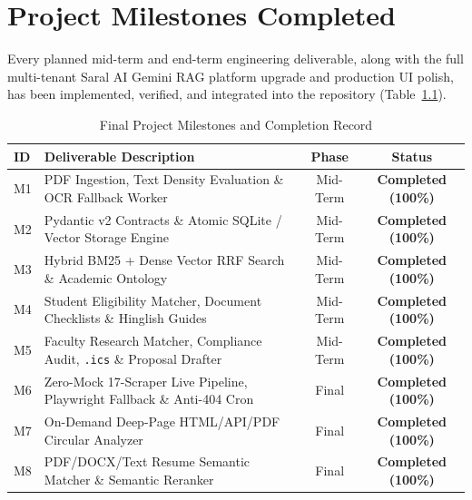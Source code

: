\documentclass[12pt,a4paper,oneside]{report}
\begin{document}
\chapter{Project Milestones Completed}

Every planned mid-term and end-term engineering deliverable, along with the full multi-tenant Saral AI Gemini RAG platform upgrade and production UI polish, has been implemented, verified, and integrated into the repository (Table~\ref{tab:milestones}).

\begin{table}[htbp]
    \centering
    \caption{Final Project Milestones and Completion Record}
    \label{tab:milestones}
    \footnotesize
    \begin{tabularx}{\textwidth}{lXcc}
        \toprule
        \textbf{ID} & \textbf{Deliverable Description} & \textbf{Phase} & \textbf{Status} \\
        \midrule
        M1 & PDF Ingestion, Text Density Evaluation \& OCR Fallback Worker & Mid-Term & \textcolor{successColor}{\textbf{Completed (100\%)}} \\
        M2 & Pydantic v2 Contracts \& Atomic SQLite / Vector Storage Engine & Mid-Term & \textcolor{successColor}{\textbf{Completed (100\%)}} \\
        M3 & Hybrid BM25 + Dense Vector RRF Search \& Academic Ontology & Mid-Term & \textcolor{successColor}{\textbf{Completed (100\%)}} \\
        M4 & Student Eligibility Matcher, Document Checklists \& Hinglish Guides & Mid-Term & \textcolor{successColor}{\textbf{Completed (100\%)}} \\
        M5 & Faculty Research Matcher, Compliance Audit, \texttt{.ics} \& Proposal Drafter & Mid-Term & \textcolor{successColor}{\textbf{Completed (100\%)}} \\
        M6 & Zero-Mock 17-Scraper Live Pipeline, Playwright Fallback \& Anti-404 Cron & Final & \textcolor{successColor}{\textbf{Completed (100\%)}} \\
        M7 & On-Demand Deep-Page HTML/API/PDF Circular Analyzer & Final & \textcolor{successColor}{\textbf{Completed (100\%)}} \\
        M8 & PDF/DOCX/Text Resume Semantic Matcher \& Semantic Reranker & Final & \textcolor{successColor}{\textbf{Completed (100\%)}} \\

\end{tabularx}
\end{table}
\end{document}
